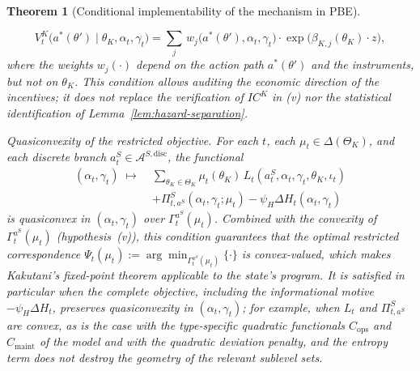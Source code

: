 \documentclass[pdflatex,sn-mathphys-ay]{sn-jnl}
\theoremstyle{plain}
\newtheorem{theorem}{Theorem}
\theoremstyle{definition}
\newcommand{\ThetaK}{\Theta_K}
\newcommand{\1}{\mathbf{1}}
\begin{document}
\begin{theorem}[Conditional implementability of the mechanism in PBE]
\begin{list}{}
  \[
    V^K_t\!\bigl(a^\ast(\theta')\mid\theta_K,\alpha_t,\gamma_t\bigr)
    =
    \sum_{j}\,w_j\!\bigl(a^\ast(\theta'),\alpha_t,\gamma_t\bigr)
    \cdot\exp\!\bigl(\beta_{K,j}(\theta_K)\cdot z\bigr),
  \]
  where the weights $w_j(\cdot)$ depend on the action path $a^\ast(\theta')$ and the instruments, but not on $\theta_K$. This condition allows auditing the economic direction of the incentives; it does not replace the verification of $IC^K$ in \textup{(v)} nor the statistical identification of Lemma~\ref{lem:hazard-separation}.
  \item[\textup{(vii)}] Quasiconvexity of the restricted objective. For each $t$, each $\mu_t\in\Delta(\ThetaK)$, and each discrete branch $a_t^S\in\mathcal{A}^{S,\mathrm{disc}}$, the functional
  \[
  \begin{split}
  (\alpha_t,\gamma_t)\;\mapsto\;&\sum_{\theta_K\in\ThetaK}\mu_t(\theta_K)\,L_t(a_t^S,\alpha_t,\gamma_t,\theta_K,\iota_t) \\
  &+\Pi_{t,a^S}^S(\alpha_t,\gamma_t;\mu_t)
  -\psi_H\Delta H_t(\alpha_t,\gamma_t)
  \end{split}
  \]
  is quasiconvex in $(\alpha_t,\gamma_t)$ over $\Gamma_t^{a^S}(\mu_t)$. Combined with the convexity of $\Gamma_t^{a^S}(\mu_t)$ \textup{(}hypothesis~\textup{(v)}\textup{)}, this condition guarantees that the optimal restricted correspondence $\Psi_t(\mu_t):=\arg\min_{\Gamma_t^{a^S}(\mu_t)}\{\cdot\}$ is convex-valued, which makes Kakutani's fixed-point theorem applicable to the state's program. It is satisfied in particular when the complete objective, including the informational motive $-\psi_H\Delta H_t$, preserves quasiconvexity in $(\alpha_t,\gamma_t)$; for example, when $L_t$ and $\Pi_{t,a^S}^S$ are convex, as is the case with the type-specific quadratic functionals $C_{\mathrm{ops}}$ and $C_{\mathrm{maint}}$ of the model and with the quadratic deviation penalty, and the entropy term does not destroy the geometry of the relevant sublevel sets.
\end{list}


\end{theorem}
\end{document}

